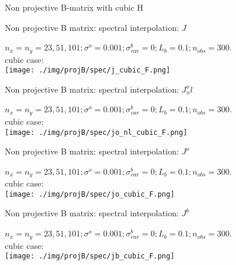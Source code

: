 \documentclass[francais]{beamer}
\begin{document}

\begin{frame}
\begin{center}
\huge{Non projective B-matrix with cubic H}
\end{center}
\end{frame}

\begin{frame}{Non projective B matrix: spectral interpolation: $J$}
\begin{center}
$n_x=n_y=23,51,101 ; \sigma^o = 0.001 ; \sigma^b_{var} = 0 ; L_b = 0.1 ; n_{obs}=300$.\\
cubic case:\\
\texttt{[image: ./img/projB/spec/j\_cubic\_F.png]}
\end{center}
\end{frame}

\begin{frame}{Non projective B matrix: spectral interpolation: $J^o_nl$}
\begin{center}
$n_x=n_y=23,51,101 ; \sigma^o = 0.001 ; \sigma^b_{var} = 0 ; L_b = 0.1 ; n_{obs}=300$.\\
cubic case:\\
\texttt{[image: ./img/projB/spec/jo\_nl\_cubic\_F.png]}
\end{center}
\end{frame}

\begin{frame}{Non projective B matrix: spectral interpolation: $J^o$}
\begin{center}
$n_x=n_y=23,51,101 ; \sigma^o = 0.001 ; \sigma^b_{var} = 0 ; L_b = 0.1 ; n_{obs}=300$.\\
cubic case:\\
\texttt{[image: ./img/projB/spec/jo\_cubic\_F.png]}
\end{center}
\end{frame}

\begin{frame}{Non projective B matrix: spectral interpolation: $J^b$}
\begin{center}
$n_x=n_y=23,51,101 ; \sigma^o = 0.001 ; \sigma^b_{var} = 0 ; L_b = 0.1 ; n_{obs}=300$.\\
cubic case:\\
\texttt{[image: ./img/projB/spec/jb\_cubic\_F.png]}
\end{center}
\end{frame}
\end{document}
